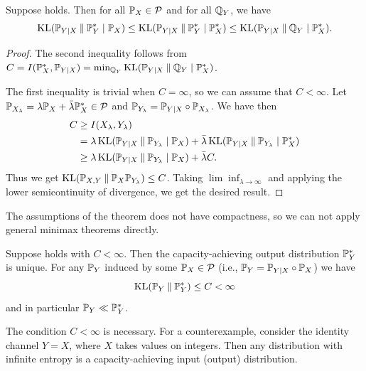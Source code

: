 \begin{theorem}
    Suppose  holds.
    Then for all $\mathbb{P}_X\in\mathcal{P}$ and for all $\mathbb{Q}_Y$, we have 
    \[\operatorname{KL}(\mathbb{P}_{Y|X}\mathbin{\|} \mathbb{P}_Y^*\mid\mathbb{P}_X)\leq \operatorname{KL}(\mathbb{P}_{Y|X}\mathbin{\|}\mathbb{P}_Y^*\mid \mathbb{P}_X^*)\leq\operatorname{KL}(\mathbb{P}_{Y|X}\mathbin{\|}\mathbb{Q}_Y\mid\mathbb{P}_X^*).\]
\end{theorem}
\begin{proof}
    The second inequality follows from $C=I(\mathbb{P}_X^*,\mathbb{P}_{Y|X})=\min_{\mathbb{Q}_Y}\operatorname{KL}(\mathbb{P}_{Y|X}\mathbin{\|}\mathbb{Q}_Y\mid\mathbb{P}_X^*)$.

    The first inequality is trivial when $C=\infty$, so we can assume that $C<\infty$.
    Let $\mathbb{P}_{X_\lambda}=\lambda\mathbb{P}_X+\bar{\lambda}\mathbb{P}_X^*\in\mathcal{P}$ and $\mathbb{P}_{Y_\lambda}=\mathbb{P}_{Y|X}\circ\mathbb{P}_{X_\lambda}$.
    We have then 
    \begin{align*}
        C&\geq I(X_\lambda,Y_\lambda)\\
        &=\lambda\operatorname{KL}(\mathbb{P}_{Y|X}\mathbin{\|}\mathbb{P}_{Y_\lambda}\mid\mathbb{P}_X)+\bar{\lambda}\operatorname{KL}(\mathbb{P}_{Y|X}\mathbin{\|}\mathbb{P}_{Y_\lambda}\mid\mathbb{P}_X^*)\\
        &\geq \lambda \operatorname{KL}(\mathbb{P}_{Y|X}\mathbin{\|}\mathbb{P}_{Y_\lambda}\mid\mathbb{P}_X) + \bar{\lambda}C.
    \end{align*}
    Thus we get $\operatorname{KL}(\mathbb{P}_{X,Y}\mathbin{\|} \mathbb{P}_X\mathbb{P}_{Y_\lambda})\leq C$.
    Taking $\lim\inf_{\lambda\to\infty}$ and applying the lower semicontinuity of divergence, we get the desired result.
\end{proof}
\begin{remark}
    The assumptions of the theorem does not have compactness, so we can not apply general minimax theorems directly.
\end{remark}

\begin{corollary}
    Suppose  holds with $C<\infty$.
    Then the capacity-achieving output distribution $\mathbb{P}_Y^*$ is unique.
    For any $\mathbb{P}_Y$ induced by some $\mathbb{P}_X\in\mathcal{P}$ (i.e., $\mathbb{P}_Y=\mathbb{P}_{Y|X}\circ\mathbb{P}_X$) we have
    \[\operatorname{KL}(\mathbb{P}_Y\mathbin{\|}\mathbb{P}_Y^*)\leq C<\infty\]
    and in particular $\mathbb{P}_Y\ll\mathbb{P}_Y^*$.
\end{corollary}
\begin{remark}
    The condition $C<\infty$ is necessary. For a counterexample, consider the identity channel $Y=X$, where $X$ takes values on integers.
    Then any distribution with infinite entropy is a capacity-achieving input (output) distribution.
\end{remark}

